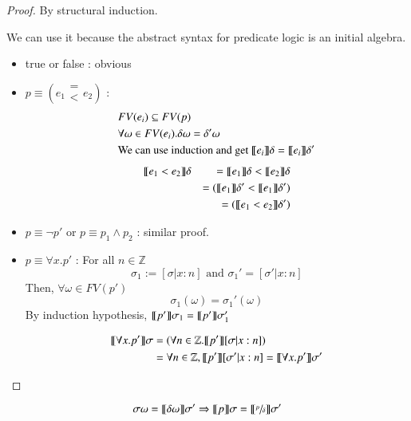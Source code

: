 \documentclass{report}[12pt]
\begin{document}
\begin{proof}
    By structural induction.

    We can use it because the abstract syntax for predicate logic is an initial algebra.
    \begin{itemize}
        \item true or false :  obvious
        \item $p\equiv (e_1 \begin{array}{c} =\\<\end{array}e_2)$ :
        \begin{align*}
            &FV(e_i) \subseteq FV(p) \\
            &\forall \omega \in FV(e_i). \delta \omega = \delta' \omega \\
            &\text{We can use induction and get }\llbracket  e_i  \rrbracket \delta = \llbracket  e_i  \rrbracket \delta'
        \end{align*}
        \begin{align*}
            &\llbracket  e_1 < e_2  \rrbracket \delta &= \llbracket  e_1  \rrbracket \delta < \llbracket  e_2  \rrbracket \delta \\
            & &= (\llbracket  e_1  \rrbracket \delta' < \llbracket  e_1  \rrbracket \delta') \\
            & &= (\llbracket  e_1 < e_2  \rrbracket \delta')
        \end{align*}
        \item $p\equiv \neg p'$ or $p\equiv p_1 \wedge p_2$ : similar proof.
        \item $p\equiv \forall x.p'$ : For all $n \in \mathbb{Z}$
        \[\sigma_1 := [\sigma|x:n]\text{ and }\sigma_1'=[\sigma'|x:n]\]
        Then, $\forall \omega \in FV(p')$
        \[\sigma_1(\omega)=\sigma_1'(\omega)\]
        By induction hypothesis, $\llbracket  p'  \rrbracket \sigma_1 = \llbracket  p'  \rrbracket \sigma_1'$

        \begin{align*}
            \llbracket  \forall x. p'  \rrbracket \sigma &= (\forall n \in \mathbb{Z}. \llbracket  p'  \rrbracket [\sigma|x:n]) \\
            &=\forall n \in \mathbb{Z}, \llbracket  p'  \rrbracket [\sigma' | x:n] = \llbracket  \forall x. p'  \rrbracket \sigma'
        \end{align*}
    \end{itemize}
\end{proof}
\begin{proposition}[Substitution]
    \[\sigma \omega = \llbracket  \delta \omega  \rrbracket \sigma' \Rightarrow \llbracket  p \rrbracket \sigma = \llbracket  \sfrac{p}{\delta}  \rrbracket \sigma'\]
\end{proposition}
\end{document}
